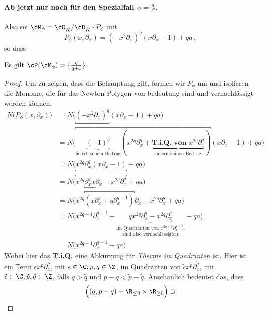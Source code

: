 \paragraph{Ab jetzt nur noch für den Spezialfall $\phi=\frac{a}{t^{q}}$.}
Also sei $\cM_\phi=\cD_{\hat K}/\cD_{\hat K}\cdot P_\phi$ mit
\[
P_{\phi}(x,\partial_x) =(-x^2\partial_x)^{q} (x\partial_x-1)+qa \,,
\]
so dass
\begin{lem}
Es gilt $\cP(\cM_{\phi})=\{\frac{q}{q+1}\}$.
\end{lem}
\begin{comment}
Allgemeiner? für allgemeine $\phi$??
\end{comment}
\begin{proof} \cite[5.b.]{sabbah_Fourier-local}
Um zu zeigen, dass die Behauptung gilt, formen wir $P_{\phi}$ um und isolieren
die Monome, die für das Newton-Polygon von bedeutung sind und vernachlässigt
werden können.
\begin{align*}
N\Big(P_{\phi}(x,\partial_x)\Big) &= N\Big(\underbracket{(-x^2\partial_x)^{q}}
  (x\partial_x-1)+qa\Big)
\\&= N\Big(\overbracket{\underset{\text{liefert keinen
Beitrag}}{\underbrace{(-1)^q}}(x^{2q}\partial_x^q
  + \underset{\text{liefern keinen Beitrag}}{
  \underbrace{\textbf{T.i.Q. von }x^{2q}\partial_x^q}})}
  (x\partial_x - 1) + qa \Big)
\\&= N\Big( \underbracket{x^{2q}\partial_x^q (x\partial_x - 1)} + qa \Big)
\\&= N\Big(\overbracket{x^{2q}\underbracket{\partial_x^q x}\partial_x
  - x^{2q}\partial_x^q} + qa \Big)
\\&= N\Big(x^{2q}\overbracket{(x\partial_x^q + q\partial_x^{q-1})}\partial_x
  - x^{2q}\partial_x^q + qa \Big)
\\&= N\Big(x^{2q + 1}\partial_x^{q + 1}
  + \underset{\text{sind also vernachlässigbar}}{
  \underset{\text{im Quadranten von $x^{2q + 1}\partial_x^{q + 1}$,}}{
  \underbrace{qx^{2q}\partial_x^{q} - x^{2q}\partial_x^q}}} + qa \Big)
\\&= N\Big(x^{2q + 1}\partial_x^{q + 1} + qa \Big)
\end{align*}
Wobei hier das \textbf{T.i.Q.} eine Abkürzung für \emph{Therme im Quadranten}
ist.
Hier ist ein Term $\epsilon x^{p}\partial_x^{q}$, mit $\epsilon\in \C, p,q
\in \Z$, im Quadranten von
$\tilde\epsilon x^{\tilde p}\partial_x^{\tilde q}$, mit $\tilde\epsilon\in \C,
\tilde p,\tilde q \in \Z$, falls $q>\tilde q$ und $p-q<\tilde p - \tilde q$.
Anschaulich bedeutet das, dass
\[
\Big( (q,p-q) + \R_{\leq 0} \times \R_{\geq 0} \Big) \supset
\]
\end{proof}
